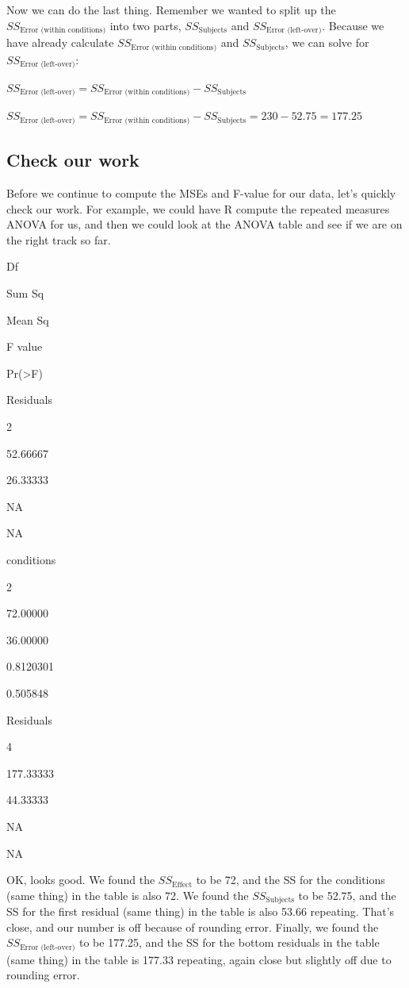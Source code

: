 \documentclass[
]{book}
\begin{document}
Now we can do the last thing. Remember we wanted to split up the \(SS_\text{Error (within conditions)}\) into two parts, \(SS_\text{Subjects}\) and \(SS_\text{Error (left-over)}\). Because we have already calculate \(SS_\text{Error (within conditions)}\) and \(SS_\text{Subjects}\), we can solve for \(SS_\text{Error (left-over)}\):

\(SS_\text{Error (left-over)} = SS_\text{Error (within conditions)} - SS_\text{Subjects}\)

\(SS_\text{Error (left-over)} = SS_\text{Error (within conditions)} - SS_\text{Subjects} = 230 - 52.75 = 177.25\)

\hypertarget{check-our-work}{%
\subsection{Check our work}\label{check-our-work}}

Before we continue to compute the MSEs and F-value for our data, let's quickly check our work. For example, we could have R compute the repeated measures ANOVA for us, and then we could look at the ANOVA table and see if we are on the right track so far.

Df

Sum Sq

Mean Sq

F value

Pr(\textgreater F)

Residuals

2

52.66667

26.33333

NA

NA

conditions

2

72.00000

36.00000

0.8120301

0.505848

Residuals

4

177.33333

44.33333

NA

NA

OK, looks good. We found the \(SS_\text{Effect}\) to be 72, and the SS for the conditions (same thing) in the table is also 72. We found the \(SS_\text{Subjects}\) to be 52.75, and the SS for the first residual (same thing) in the table is also 53.66 repeating. That's close, and our number is off because of rounding error. Finally, we found the \(SS_\text{Error (left-over)}\) to be 177.25, and the SS for the bottom residuals in the table (same thing) in the table is 177.33 repeating, again close but slightly off due to rounding error.
\end{document}

